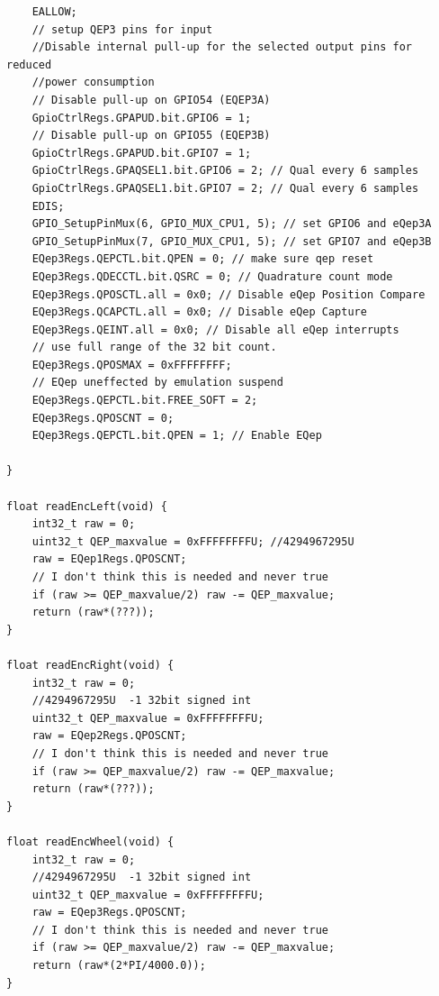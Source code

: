 \documentclass[11pt]{article}
\begin{document}
\begin{verbatim}
    EALLOW;
    // setup QEP3 pins for input
    //Disable internal pull-up for the selected output pins for reduced
    //power consumption
    // Disable pull-up on GPIO54 (EQEP3A)
    GpioCtrlRegs.GPAPUD.bit.GPIO6 = 1;
    // Disable pull-up on GPIO55 (EQEP3B)
    GpioCtrlRegs.GPAPUD.bit.GPIO7 = 1;
    GpioCtrlRegs.GPAQSEL1.bit.GPIO6 = 2; // Qual every 6 samples
    GpioCtrlRegs.GPAQSEL1.bit.GPIO7 = 2; // Qual every 6 samples
    EDIS;
    GPIO_SetupPinMux(6, GPIO_MUX_CPU1, 5); // set GPIO6 and eQep3A
    GPIO_SetupPinMux(7, GPIO_MUX_CPU1, 5); // set GPIO7 and eQep3B
    EQep3Regs.QEPCTL.bit.QPEN = 0; // make sure qep reset
    EQep3Regs.QDECCTL.bit.QSRC = 0; // Quadrature count mode
    EQep3Regs.QPOSCTL.all = 0x0; // Disable eQep Position Compare
    EQep3Regs.QCAPCTL.all = 0x0; // Disable eQep Capture
    EQep3Regs.QEINT.all = 0x0; // Disable all eQep interrupts
    // use full range of the 32 bit count.
    EQep3Regs.QPOSMAX = 0xFFFFFFFF;
    // EQep uneffected by emulation suspend
    EQep3Regs.QEPCTL.bit.FREE_SOFT = 2;
    EQep3Regs.QPOSCNT = 0;
    EQep3Regs.QEPCTL.bit.QPEN = 1; // Enable EQep

}

float readEncLeft(void) {
    int32_t raw = 0;
    uint32_t QEP_maxvalue = 0xFFFFFFFFU; //4294967295U
    raw = EQep1Regs.QPOSCNT;
    // I don't think this is needed and never true
    if (raw >= QEP_maxvalue/2) raw -= QEP_maxvalue;
    return (raw*(???));
}

float readEncRight(void) {
    int32_t raw = 0;
    //4294967295U  -1 32bit signed int
    uint32_t QEP_maxvalue = 0xFFFFFFFFU;
    raw = EQep2Regs.QPOSCNT;
    // I don't think this is needed and never true
    if (raw >= QEP_maxvalue/2) raw -= QEP_maxvalue;
    return (raw*(???));
}

float readEncWheel(void) {
    int32_t raw = 0;
    //4294967295U  -1 32bit signed int
    uint32_t QEP_maxvalue = 0xFFFFFFFFU;
    raw = EQep3Regs.QPOSCNT;
    // I don't think this is needed and never true
    if (raw >= QEP_maxvalue/2) raw -= QEP_maxvalue;
    return (raw*(2*PI/4000.0));
}
\end{verbatim}
%
\end{document}
